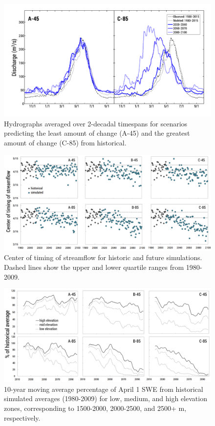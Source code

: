 \documentclass[water,article,submit,moreauthors,pdftex,10pt,a4paper]{mdpi}
\theoremstyle{mdpi}
\newcounter{ex}
\newcounter{re}
\theoremstyle{mdpidefinition}
\begin{document}
\begin{figure}
\centering
\includegraphics[width=\textwidth]{figure-files/figure10.png}
\caption{Hydrographs averaged over 2-decadal timespans for scenarios predicting the least amount of change (A-45) and the greatest amount of change (C-85) from historical.}
\label{fig:HydrographDecadeAvg}
\end{figure}
\clearpage

\begin{figure}
\centering
\includegraphics[width=\textwidth]{figure-files/figure11.png}
\caption{Center of timing of streamflow for historic and future simulations. Dashed lines show the upper and lower quartile ranges from 1980-2009. }
\label{fig:CenterOfTiming}
\end{figure}
\clearpage

\begin{figure}
\centering
\includegraphics[width=\textwidth]{figure-files/figure12.png}
\caption{10-year moving average percentage of April 1 SWE from historical simulated averages (1980-2009) for low, medium, and high elevation zones, corresponding to 1500-2000, 2000-2500, and 2500+ m, respectively.}
\label{fig:PercentApril1SWE}
\end{figure}
\clearpage
\end{document}
